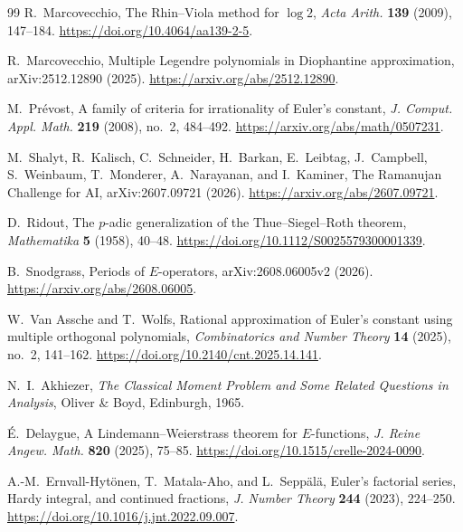 \documentclass[11pt]{article}
\theoremstyle{definition}
\theoremstyle{remark}
\begin{document}
\begin{thebibliography}{99}
R.~Marcovecchio,
\newblock The Rhin--Viola method for \(\log 2\),
\newblock \emph{Acta Arith.} \textbf{139} (2009), 147--184.
\newblock \url{https://doi.org/10.4064/aa139-2-5}.

R.~Marcovecchio,
\newblock Multiple Legendre polynomials in Diophantine approximation,
\newblock arXiv:2512.12890 (2025).
\newblock \url{https://arxiv.org/abs/2512.12890}.

M.~Pr\'evost,
\newblock A family of criteria for irrationality of Euler's constant,
\newblock \emph{J. Comput. Appl. Math.} \textbf{219} (2008), no.~2,
484--492.
\newblock \url{https://arxiv.org/abs/math/0507231}.

M.~Shalyt, R.~Kalisch, C.~Schneider, H.~Barkan, E.~Leibtag,
J.~Campbell, S.~Weinbaum, T.~Monderer, A.~Narayanan, and I.~Kaminer,
\newblock The Ramanujan Challenge for AI,
\newblock arXiv:2607.09721 (2026).
\newblock \url{https://arxiv.org/abs/2607.09721}.

D.~Ridout,
\newblock The \(p\)-adic generalization of the Thue--Siegel--Roth theorem,
\newblock \emph{Mathematika} \textbf{5} (1958), 40--48.
\newblock \url{https://doi.org/10.1112/S0025579300001339}.

B.~Snodgrass,
\newblock Periods of \(E\)-operators,
\newblock arXiv:2608.06005v2 (2026).
\newblock \url{https://arxiv.org/abs/2608.06005}.

W.~Van Assche and T.~Wolfs,
\newblock Rational approximation of Euler's constant using multiple
orthogonal polynomials,
\newblock \emph{Combinatorics and Number Theory} \textbf{14} (2025),
no.~2, 141--162.
\newblock \url{https://doi.org/10.2140/cnt.2025.14.141}.

N.~I.~Akhiezer,
\newblock \emph{The Classical Moment Problem and Some Related Questions in
Analysis},
\newblock Oliver \& Boyd, Edinburgh, 1965.

\'E.~Delaygue,
\newblock A Lindemann--Weierstrass theorem for \(E\)-functions,
\newblock \emph{J. Reine Angew. Math.} \textbf{820} (2025), 75--85.
\newblock \url{https://doi.org/10.1515/crelle-2024-0090}.

A.-M.~Ernvall-Hyt\"onen, T.~Matala-Aho, and L.~Sepp\"al\"a,
\newblock Euler's factorial series, Hardy integral, and continued fractions,
\newblock \emph{J. Number Theory} \textbf{244} (2023), 224--250.
\newblock \url{https://doi.org/10.1016/j.jnt.2022.09.007}.


\end{thebibliography}
\end{document}
